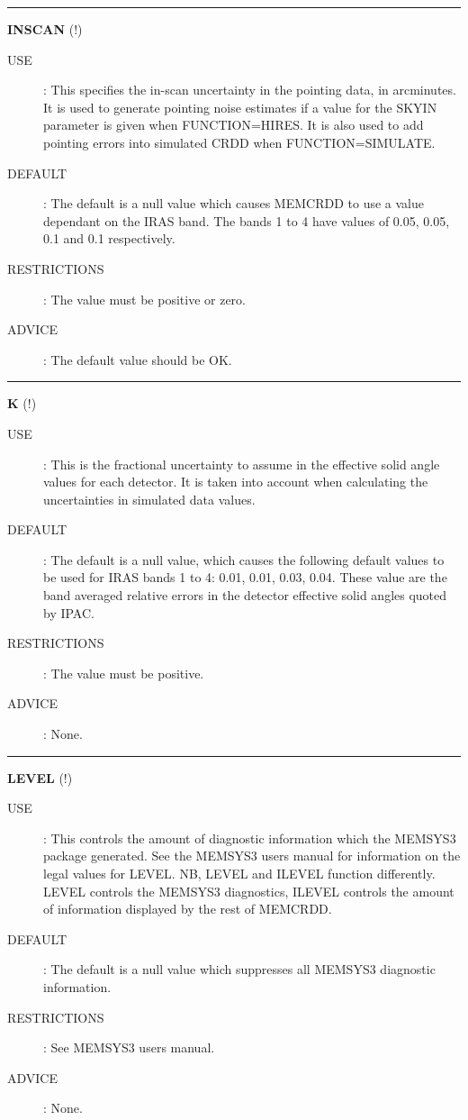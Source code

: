 \rule{\textwidth}{0.3mm}
{\Large {\bf INSCAN} (!)}
\begin{description}
\item [USE]:
This specifies the in-scan uncertainty in the pointing data, in arcminutes.
It is used to generate pointing noise estimates if a value for the SKYIN
parameter is given when FUNCTION=HIRES. It is also used to
add pointing errors into simulated CRDD when FUNCTION=SIMULATE.
\item [DEFAULT]:
The default is a null value which causes MEMCRDD to use a value dependant on the
IRAS band. The bands 1 to 4 have values of 0.05, 0.05, 0.1 and 0.1 respectively.
\item [RESTRICTIONS]:
The value must be positive or zero.
\item [ADVICE]:
The default value should be OK.
\end {description}

\rule{\textwidth}{0.3mm}
{\Large {\bf K } (!)}
\begin{description}
\item [USE]:
This is the fractional uncertainty to assume in the effective solid angle values
for each detector. It is taken into account when calculating the uncertainties
in simulated data values.
\item [DEFAULT]:
The default is a null value, which causes the following default values to be
used for IRAS bands 1 to 4: 0.01, 0.01, 0.03, 0.04. These value are the band
averaged relative errors in the detector effective solid angles quoted by IPAC.
\item [RESTRICTIONS]:
The value must be positive.
\item [ADVICE]:
None.
\end {description}

\rule{\textwidth}{0.3mm}
{\Large {\bf LEVEL} (!)}
\begin{description}
\item [USE]:
This controls the amount of diagnostic information which the MEMSYS3 package
generated. See the MEMSYS3 users manual for information on the legal values for
LEVEL. NB, LEVEL and ILEVEL function differently. LEVEL controls the MEMSYS3
diagnostics, ILEVEL controls the amount of information displayed by the rest
of MEMCRDD.
\item [DEFAULT]:
The default is a null value which suppresses all MEMSYS3 diagnostic information.
\item [RESTRICTIONS]:
See MEMSYS3 users manual.
\item [ADVICE]:
None.
\end {description}

